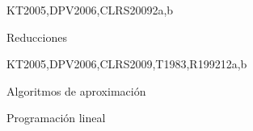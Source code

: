 \begin{syllabus}
\begin{unit}{\ALBasicAutomataComputabilityandComplexity}{}{KT2005,DPV2006,CLRS2009}{2}{a,b}
\begin{topics}%
    \item \ALBasicAutomataComputabilityandComplexityTopicIntroduction %
    \item \ALBasicAutomataComputabilityandComplexityTopicIntroductionTo %
    \item Reducciones
\end{topics}
\begin{learningoutcomes}
    \item \ALBasicAutomataComputabilityandComplexityLODefine [\Familiarity] %
    \item \ALBasicAutomataComputabilityandComplexityLOExplainTheNp [\Familiarity] %
\end{learningoutcomes}
\end{unit}

\begin{unit}{\ALAdvancedDataStructuresAlgorithmsandAnalysis}{}{KT2005,DPV2006,CLRS2009,T1983,R1992}{12}{a,b}
\begin{topics}%
    \item \ALAdvancedDataStructuresAlgorithmsandAnalysisTopicGraphs %
    \item \ALAdvancedDataStructuresAlgorithmsandAnalysisTopicRandomized %
    \item \ALAdvancedDataStructuresAlgorithmsandAnalysisTopicAmortized %
    \item \ALAdvancedDataStructuresAlgorithmsandAnalysisTopicProbabilistic %
    \item Algoritmos de aproximación
    \item Programación lineal
\end{topics}
\begin{learningoutcomes}
    \item \ALAdvancedDataStructuresAlgorithmsandAnalysisLOUnderstand [\Familiarity]%
    \item \ALAdvancedDataStructuresAlgorithmsandAnalysisLOSelect [\Usage] %
    \item \ALAdvancedDataStructuresAlgorithmsandAnalysisLOSelectAnd [\Usage] %
\end{learningoutcomes}
\end{unit}

\begin{coursebibliography}
\end{coursebibliography}

\end{syllabus}
